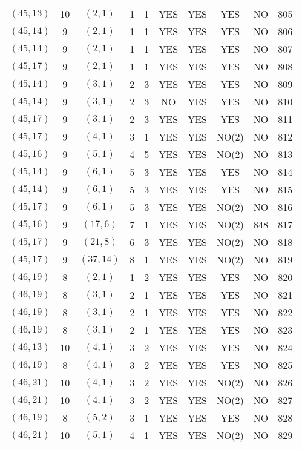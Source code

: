 \begin{longtable}{|c|c|c|c|c|c|c|c|c|c|}
$(45, 13)$ & 10 & $(2, 1)$ & 1 & 1 & YES & YES & YES & NO & 805\\
$(45, 14)$ & 9 & $(2, 1)$ & 1 & 1 & YES & YES & YES & NO & 806\\
$(45, 14)$ & 9 & $(2, 1)$ & 1 & 1 & YES & YES & YES & NO & 807\\
$(45, 17)$ & 9 & $(2, 1)$ & 1 & 1 & YES & YES & YES & NO & 808\\
$(45, 14)$ & 9 & $(3, 1)$ & 2 & 3 & YES & YES & YES & NO & 809\\
$(45, 14)$ & 9 & $(3, 1)$ & 2 & 3 & NO & YES & YES & NO & 810\\
$(45, 17)$ & 9 & $(3, 1)$ & 2 & 3 & YES & YES & YES & NO & 811\\
$(45, 17)$ & 9 & $(4, 1)$ & 3 & 1 & YES & YES & NO(2) & NO & 812\\
$(45, 16)$ & 9 & $(5, 1)$ & 4 & 5 & YES & YES & NO(2) & NO & 813\\
$(45, 14)$ & 9 & $(6, 1)$ & 5 & 3 & YES & YES & YES & NO & 814\\
$(45, 14)$ & 9 & $(6, 1)$ & 5 & 3 & YES & YES & YES & NO & 815\\
$(45, 17)$ & 9 & $(6, 1)$ & 5 & 3 & YES & YES & NO(2) & NO & 816\\
$(45, 16)$ & 9 & $(17, 6)$ & 7 & 1 & YES & YES & NO(2) & 848 & 817\\
$(45, 17)$ & 9 & $(21, 8)$ & 6 & 3 & YES & YES & NO(2) & NO & 818\\
$(45, 17)$ & 9 & $(37, 14)$ & 8 & 1 & YES & YES & NO(2) & NO & 819\\
$(46, 19)$ & 8 & $(2, 1)$ & 1 & 2 & YES & YES & YES & NO & 820\\
$(46, 19)$ & 8 & $(3, 1)$ & 2 & 1 & YES & YES & YES & NO & 821\\
$(46, 19)$ & 8 & $(3, 1)$ & 2 & 1 & YES & YES & YES & NO & 822\\
$(46, 19)$ & 8 & $(3, 1)$ & 2 & 1 & YES & YES & YES & NO & 823\\
$(46, 13)$ & 10 & $(4, 1)$ & 3 & 2 & YES & YES & YES & NO & 824\\
$(46, 19)$ & 8 & $(4, 1)$ & 3 & 2 & YES & YES & YES & NO & 825\\
$(46, 21)$ & 10 & $(4, 1)$ & 3 & 2 & YES & YES & NO(2) & NO & 826\\
$(46, 21)$ & 10 & $(4, 1)$ & 3 & 2 & YES & YES & NO(2) & NO & 827\\
$(46, 19)$ & 8 & $(5, 2)$ & 3 & 1 & YES & YES & YES & NO & 828\\
$(46, 21)$ & 10 & $(5, 1)$ & 4 & 1 & YES & YES & NO(2) & NO & 829\\

\end{longtable}
